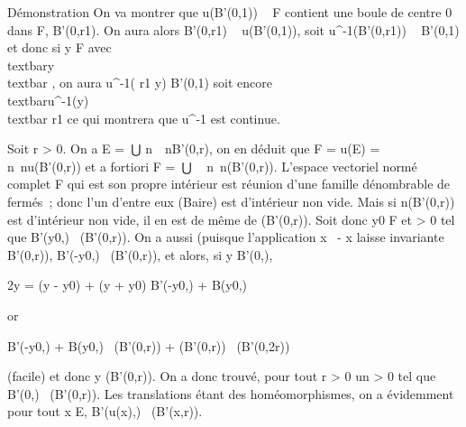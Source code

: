 Démonstration On va montrer que u(B'(0,1)) \subset~ F contient une boule de
centre 0 dans F, B'(0,r1). On aura alors B'(0,r1) \subset~
u(B'(0,1)), soit u^-1(B'(0,r1)) \subset~ B'(0,1) et donc
si y \in F avec \\textbar{}y\\textbar{} ,
on aura u^-1( r1  y) \in
B'(0,1) soit encore
\\textbar{}u^-1(y)\\textbar{}
 \over r1 ce qui montrera que
u^-1 est continue.

Soit r \textgreater{} 0. On a E =  n\in{}~~nB'(0,r), on en déduit que F =
u(E) = \⋃ ~
n\in{}~nu(B'(0,r)) et a fortiori F =\
⋃ ~
n\in\mathbb{N}~n\overlineu(B'(0,r)). L'espace vectoriel
normé complet F qui est son propre intérieur est réunion d'une famille
dénombrable de fermés~; donc l'un d'entre eux (Baire) est d'intérieur
non vide. Mais si n\overlineu(B'(0,r)) est
d'intérieur non vide, il en est de même de
\overlineu(B'(0,r)). Soit donc y0 \in F et \rho
\textgreater{} 0 tel que B'(y0,\rho)
\subset~\overlineu(B'(0,r)). On a aussi (puisque
l'application x\mapsto~ - x laisse invariante
B'(0,r)), B'(-y0,\rho) \subset~\overlineu(B'(0,r)),
et alors, si y \in B'(0,\rho),

2y = (y - y0) + (y + y0) \in B'(-y0,\rho) +
B(y0,)

or

B'(-y0,\rho) + B(y0,)
\subset~\overlineu(B'(0,r)) +
\overlineu(B'(0,r))
\subset~\overlineu(B'(0,2r))

(facile) et donc y \in\overlineu(B'(0,r)). On a donc
trouvé, pour tout r \textgreater{} 0 un \rho \textgreater{} 0 tel que
B'(0,\rho) \subset~\overlineu(B'(0,r)). Les translations étant
des homéomorphismes, on a évidemment pour tout x \in E, B'(u(x),\rho)
\subset~\overlineu(B'(x,r)).

